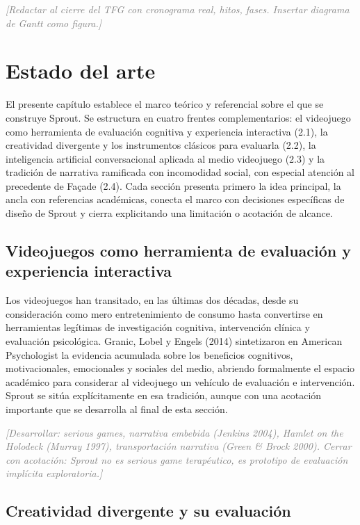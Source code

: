 \documentclass[12pt,twoside,titlepage]{report}
\begin{document}
\textcolor{gray}{\textit{[Redactar al cierre del TFG con cronograma real, hitos, fases. Insertar diagrama de Gantt como figura.]}}

\chapter{Estado del arte}

El presente capítulo establece el marco teórico y referencial sobre el que se construye Sprout. Se estructura en cuatro frentes complementarios: el videojuego como herramienta de evaluación cognitiva y experiencia interactiva (2.1), la creatividad divergente y los instrumentos clásicos para evaluarla (2.2), la inteligencia artificial conversacional aplicada al medio videojuego (2.3) y la tradición de narrativa ramificada con incomodidad social, con especial atención al precedente de Façade (2.4). Cada sección presenta primero la idea principal, la ancla con referencias académicas, conecta el marco con decisiones específicas de diseño de Sprout y cierra explicitando una limitación o acotación de alcance.

\section{Videojuegos como herramienta de evaluación y experiencia interactiva}

Los videojuegos han transitado, en las últimas dos décadas, desde su consideración como mero entretenimiento de consumo hasta convertirse en herramientas legítimas de investigación cognitiva, intervención clínica y evaluación psicológica. Granic, Lobel y Engels (2014) sintetizaron en American Psychologist la evidencia acumulada sobre los beneficios cognitivos, motivacionales, emocionales y sociales del medio, abriendo formalmente el espacio académico para considerar al videojuego un vehículo de evaluación e intervención. Sprout se sitúa explícitamente en esa tradición, aunque con una acotación importante que se desarrolla al final de esta sección.

\textcolor{gray}{\textit{[Desarrollar: serious games, narrativa embebida (Jenkins 2004), Hamlet on the Holodeck (Murray 1997), transportación narrativa (Green \& Brock 2000). Cerrar con acotación: Sprout no es serious game terapéutico, es prototipo de evaluación implícita exploratoria.]}}

\section{Creatividad divergente y su evaluación}
\end{document}
